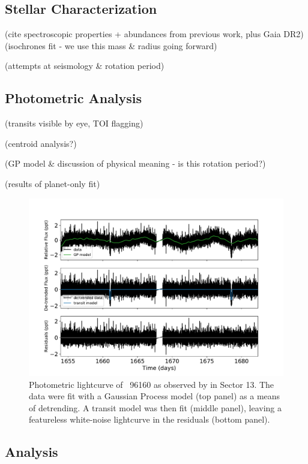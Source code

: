 \documentclass[modern]{aastex62}
\newcommand{\hoststar}{\acronym{HIP}\ 96160\xspace}
\begin{document}
\subsection{Stellar Characterization}
\label{s:analysis:star}


(cite spectroscopic properties + abundances from previous work, plus Gaia DR2)
(isochrones fit - we use this mass \& radius going forward)

(attempts at seismology \& rotation period)

\subsection{Photometric Analysis}
\label{s:analysis:photometry}

(transits visible by eye, TOI flagging)

(centroid analysis?)

(GP model \& discussion of physical meaning - is this rotation period?)

(results of planet-only fit)

\begin{figure}
    \centering
    \includegraphics[width=\textwidth]{lightcurve.pdf}
    \caption{Photometric lightcurve of \hoststar as observed by \TESS in Sector 13. The \TESS data were fit with a Gaussian Process model (top panel) as a means of detrending. A transit model was then fit (middle panel), leaving a featureless white-noise lightcurve in the residuals (bottom panel).}
    \label{fig:lightcurve}
\end{figure}

\subsection{\RV Analysis}
\label{s:analysis:rvs}
\end{document}
